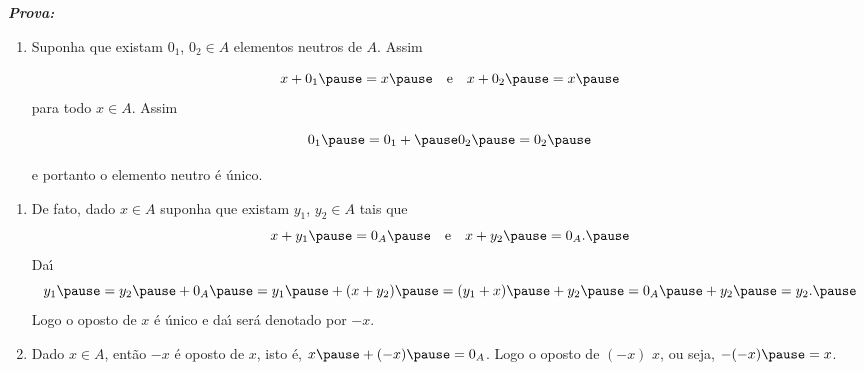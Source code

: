 \documentclass{beamer}
\begin{document}
    \begin{frame}
        \noindent \textbf{\textit{Prova:} }\pause
        \begin{enumerate}[label={\roman*})]
            \item Suponha que existam $0_1$, \pause $0_2\in A$ \pause elementos neutros \pause de $A$. \pause Assim\pause
                
            \[
                x + 0_1 \pause = x\pause \quad \mbox{e}\quad x + 0_2 \pause = x\pause
            \]
            para todo $x \in A$. \pause Assim\pause

            \[
                   0_1 \pause = 0_1 +\pause 0_2 \pause = 0_2\pause
            \]
            
            e portanto o elemento neutro \'e \'unico.\pause
            
            \seti

            \vspace{.5cm}
        \end{enumerate}
    \end{frame}

    \begin{frame}
        \begin{enumerate}[label={\roman*})]
            \conti

            \item De fato, \pause dado $x \in A$ \pause suponha que existam $y_1$, \pause $y_2\in A$ \pause tais que\pause
            \[
                x + y_1 \pause = 0_A \pause \quad \mbox{e}\quad x + y_2 \pause = 0_A.\pause
            \]
            Da{\'\i}\pause
            \[
                y_1 \pause = y_2 \pause + 0_A \pause = y_1 \pause + (x + y_2) \pause = (y_1 + x) \pause + y_2 \pause = 0_A\pause  + y_2 \pause= y_2.\pause
            \]
            Logo o oposto de $x$ \'e \'unico \pause e da{\'\i} ser\'a denotado por $-x$.\pause
                
            \vspace{.5cm}

            \item Dado $x \in A$, \pause ent\~ao $-x$ {\'e} oposto de $x$, \pause isto {\'e}, \pause $x \pause + (-x) \pause = 0_A$. \pause Logo o oposto de $(-x)$  $x$, \pause ou seja, \pause $-(-x) \pause = x$.\pause
            
        \end{enumerate}
    \end{frame}
\end{document}
